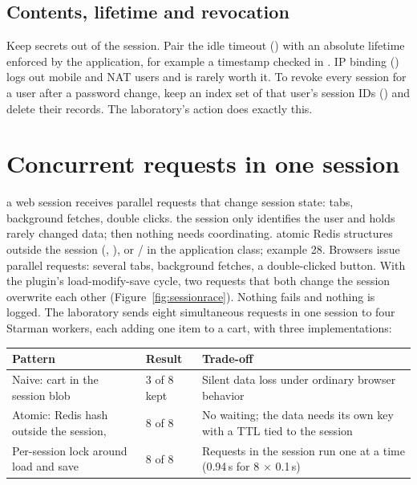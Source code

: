 \subsection*{Contents, lifetime and revocation}
Keep secrets out of the session. Pair the idle timeout () with an absolute lifetime enforced by the application, for example a  timestamp checked in . IP binding () logs out mobile and NAT users and is rarely worth it. To revoke every session for a user after a password change, keep an index set of that user's session IDs () and delete their records. The laboratory's  action does exactly this.

\section{Concurrent requests in one session}\label{sec:session-race}
{a web session receives parallel requests that change session state: tabs, background fetches, double clicks.}
{the session only identifies the user and holds rarely changed data; then nothing needs coordinating.}
{atomic Redis structures outside the session (, ), or / in the application class; example 28.}
Browsers issue parallel requests: several tabs, background fetches, a double-clicked button. With the plugin's load-modify-save cycle, two requests that both change the session overwrite each other (Figure~\ref{fig:sessionrace}). Nothing fails and nothing is logged.
The laboratory sends eight simultaneous requests in one session to four Starman workers, each adding one item to a cart, with three implementations:
\begin{longtable}{L{.22\linewidth}L{.20\linewidth}L{.50\linewidth}}\toprule Pattern & Result & Trade-off \\ \midrule\endhead
Naive: cart in the session blob & 3 of 8 kept & Silent data loss under ordinary browser behavior \\
Atomic: Redis hash outside the session,  & 8 of 8 & No waiting; the data needs its own key with a TTL tied to the session \\
Per-session lock around load and save & 8 of 8 & Requests in the session run one at a time (0.94\,s for 8 $\times$ 0.1\,s) \\
\bottomrule\end{longtable}
